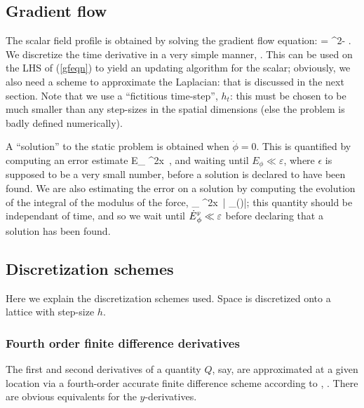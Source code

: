\documentclass[a4paper, 12pt]{article}
\numberwithin{equation}{section}
\begin{document}
\subsection{Gradient flow}
The scalar field profile is obtained by solving the gradient flow equation:
\bea
\label{gfeqn}
\dot{\phi} = \nabla^2\phi - .
\eea
We discretize the time derivative in a very simple manner,
\bea
\dot{\phi} \approx {}.
\eea
This can be used on the LHS of (\ref{gfeqn}) to yield an updating algorithm for the scalar; obviously, we also need a scheme to approximate the Laplacian: that is discussed in the next section. Note that we use a ``fictitious time-step'', $h_t$: this must be chosen to be much smaller than any  step-sizes in the spatial dimensions (else the problem is badly defined numerically).

A ``solution'' to the static problem is obtained when $\dot{\phi}=0$. This is quantified by computing an error estimate
\bea
E_{\phi}  \int \dd^2x\, \dot{\phi},
\eea
and waiting until $E_{\phi}\ll \varepsilon$, where $\epsilon$ is supposed to be a very small number, before a solution is declared to have been found. We are also estimating the error on a solution by computing the evolution of the integral of the modulus of the force,
\bea
{}_{\phi}  \int \dd^2x\, \left| _{(\phi)}\right|;
\eea
this quantity should be independant of time, and so we wait until $\dot{E}{}^{\scriptscriptstyle{\textrm{F}}}_{\phi}\ll \varepsilon$ before declaring that a solution has been found.



\subsection{Discretization schemes}
Here we explain the discretization schemes used. Space is discretized onto a lattice with step-size $h$.

\subsubsection{Fourth order finite difference derivatives}
The first and second derivatives of a quantity $Q$, say, are approximated at a given location via a fourth-order accurate finite difference scheme according to
\bea
{} \approx {},
\eea
\bea
{} \approx {}.
\eea
There are obvious equivalents for the $y$-derivatives.
\end{document}
